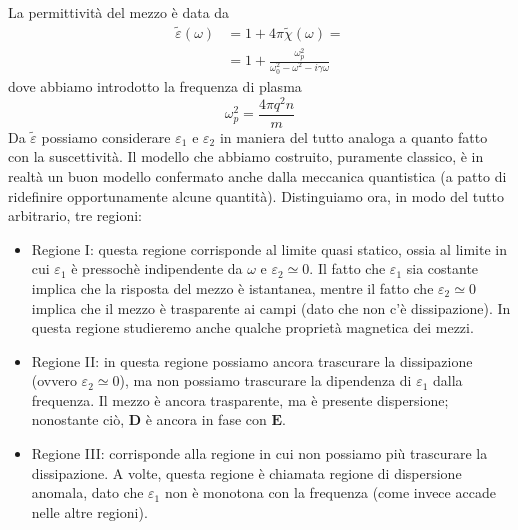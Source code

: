 \documentclass[a4paper,11pt]{book}
\renewcommand{\vec}[1]{\mathbf{#1}}
\theoremstyle{theorem}
\theoremstyle{definition}
\begin{document}
\noindent La permittività del mezzo è data da
\begin{align*}\tilde{\varepsilon}(\omega)&=1+4\pi\tilde{\chi}(\omega)=\\&=1+\frac{\omega_p^2}{\omega_0^2-\omega^2-i\gamma\omega}\end{align*}
dove abbiamo introdotto la frequenza di plasma
\[\omega_p^2=\frac{4\pi q^2n}{m}\]
Da $\tilde{\varepsilon}$ possiamo considerare $\varepsilon_1$ e $\varepsilon_2$ in maniera del tutto analoga a quanto fatto con la suscettività. Il modello che abbiamo costruito, puramente classico, è in realtà un buon modello confermato anche dalla meccanica quantistica (a patto di ridefinire opportunamente alcune quantità). Distinguiamo ora, in modo del tutto arbitrario, tre regioni:
\begin{itemize}
	\item Regione I: questa regione corrisponde al limite quasi statico, ossia al limite in cui $\varepsilon_1$ è pressochè indipendente da $\omega$ e $\varepsilon_2\simeq0$. Il fatto che $\varepsilon_1$ sia costante implica che la risposta del mezzo è istantanea, mentre il fatto che $\varepsilon_2\simeq0$ implica che il mezzo è trasparente ai campi (dato che non c'è dissipazione). In questa regione studieremo anche qualche proprietà magnetica dei mezzi.
	\item Regione II: in questa regione possiamo ancora trascurare la dissipazione (ovvero $\varepsilon_2\simeq 0$), ma non possiamo trascurare la dipendenza di $\varepsilon_1$ dalla frequenza. Il mezzo è ancora trasparente, ma è presente dispersione; nonostante ciò, $\vec{D}$ è ancora in fase con $\vec{E}$.
	\item Regione III: corrisponde alla regione in cui non possiamo più trascurare la dissipazione. A volte, questa regione è chiamata regione di dispersione anomala, dato che $\varepsilon_1$ non è monotona con la frequenza (come invece accade nelle altre regioni).
\end{itemize}
\end{document}
